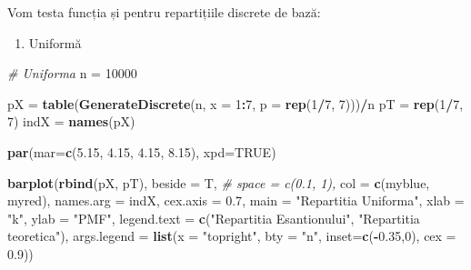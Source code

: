 \documentclass[]{article}
\newenvironment{Shaded}{\begin{snugshade}}{\end{snugshade}}
\newcommand{\CommentTok}[1]{\textcolor[rgb]{0.56,0.35,0.01}{\textit{#1}}}
\newcommand{\DataTypeTok}[1]{\textcolor[rgb]{0.13,0.29,0.53}{#1}}
\newcommand{\DecValTok}[1]{\textcolor[rgb]{0.00,0.00,0.81}{#1}}
\newcommand{\FloatTok}[1]{\textcolor[rgb]{0.00,0.00,0.81}{#1}}
\newcommand{\KeywordTok}[1]{\textcolor[rgb]{0.13,0.29,0.53}{\textbf{#1}}}
\newcommand{\NormalTok}[1]{#1}
\newcommand{\OperatorTok}[1]{\textcolor[rgb]{0.81,0.36,0.00}{\textbf{#1}}}
\newcommand{\OtherTok}[1]{\textcolor[rgb]{0.56,0.35,0.01}{#1}}
\newcommand{\StringTok}[1]{\textcolor[rgb]{0.31,0.60,0.02}{#1}}
\providecommand{\tightlist}{%
  \setlength{\itemsep}{0pt}\setlength{\parskip}{0pt}}
\begin{document}
Vom testa funcția și pentru repartițiile discrete de bază:

\begin{enumerate}
\def\labelenumi{\alph{enumi})}
\tightlist
\item
  Uniformă
\end{enumerate}

\begin{Shaded}
\begin{Highlighting}[]
\CommentTok{# Uniforma}
\NormalTok{n =}\StringTok{ }\DecValTok{10000}

\NormalTok{pX =}\StringTok{ }\KeywordTok{table}\NormalTok{(}\KeywordTok{GenerateDiscrete}\NormalTok{(n, }\DataTypeTok{x =} \DecValTok{1}\OperatorTok{:}\DecValTok{7}\NormalTok{, }
                      \DataTypeTok{p =} \KeywordTok{rep}\NormalTok{(}\DecValTok{1}\OperatorTok{/}\DecValTok{7}\NormalTok{, }\DecValTok{7}\NormalTok{)))}\OperatorTok{/}\NormalTok{n}
\NormalTok{pT =}\StringTok{ }\KeywordTok{rep}\NormalTok{(}\DecValTok{1}\OperatorTok{/}\DecValTok{7}\NormalTok{, }\DecValTok{7}\NormalTok{)}
\NormalTok{indX =}\StringTok{ }\KeywordTok{names}\NormalTok{(pX)}

\KeywordTok{par}\NormalTok{(}\DataTypeTok{mar=}\KeywordTok{c}\NormalTok{(}\FloatTok{5.15}\NormalTok{, }\FloatTok{4.15}\NormalTok{, }\FloatTok{4.15}\NormalTok{, }\FloatTok{8.15}\NormalTok{), }\DataTypeTok{xpd=}\OtherTok{TRUE}\NormalTok{)}

\KeywordTok{barplot}\NormalTok{(}\KeywordTok{rbind}\NormalTok{(pX, pT), }
        \DataTypeTok{beside =}\NormalTok{ T,}
        \CommentTok{# space = c(0.1, 1),}
        \DataTypeTok{col =} \KeywordTok{c}\NormalTok{(myblue, myred),}
        \DataTypeTok{names.arg =}\NormalTok{ indX, }
        \DataTypeTok{cex.axis =} \FloatTok{0.7}\NormalTok{, }
        \DataTypeTok{main =} \StringTok{"Repartitia Uniforma"}\NormalTok{,}
        \DataTypeTok{xlab =} \StringTok{"k"}\NormalTok{,}
        \DataTypeTok{ylab =} \StringTok{"PMF"}\NormalTok{,}
        \DataTypeTok{legend.text =} \KeywordTok{c}\NormalTok{(}\StringTok{"Repartitia Esantionului"}\NormalTok{, }\StringTok{"Repartitia teoretica"}\NormalTok{), }
        \DataTypeTok{args.legend =}  \KeywordTok{list}\NormalTok{(}\DataTypeTok{x =} \StringTok{"topright"}\NormalTok{, }\DataTypeTok{bty =} \StringTok{"n"}\NormalTok{, }
                            \DataTypeTok{inset=}\KeywordTok{c}\NormalTok{(}\OperatorTok{-}\FloatTok{0.35}\NormalTok{,}\DecValTok{0}\NormalTok{), }\DataTypeTok{cex =} \FloatTok{0.9}\NormalTok{))}
\end{Highlighting}
\end{Shaded}
\end{document}
